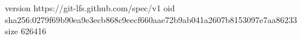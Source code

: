 version https://git-lfs.github.com/spec/v1
oid sha256:0279f69b90ea9e3ecb868c9eecf660aae72b9ab041a2607b8153097e7aa86233
size 626416
